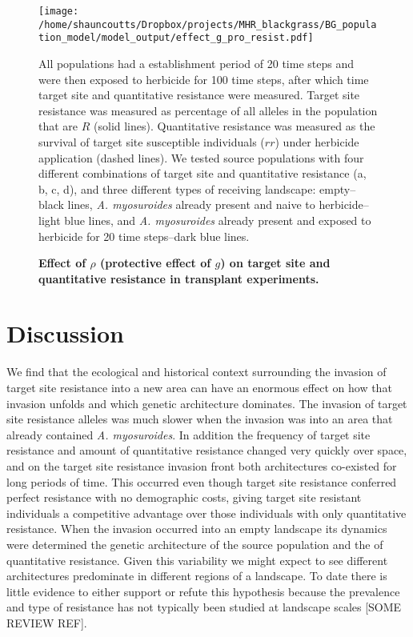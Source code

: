 \documentclass[10pt,letterpaper]{article}
\begin{document}
\begin{figure}[!h] 
	\texttt{[image: /home/shauncoutts/Dropbox/projects/MHR\_blackgrass/BG\_population\_model/model\_output/effect\_g\_pro\_resist.pdf]}
\caption{\bf Effect of $\rho$ (protective effect of $g$) on target site and quantitative resistance in transplant experiments.} All populations had a establishment period of 20 time steps and were then exposed to herbicide for 100 time steps, after which time target site and quantitative resistance were measured. Target site resistance was measured as percentage of all alleles in the population that are $R$ (solid lines). Quantitative resistance was measured as the survival of target site susceptible individuals ($rr$) under herbicide application (dashed lines). We tested source populations with four different combinations of target site and quantitative resistance (a, b, c, d), and three different types of receiving landscape: empty--black lines, \textit{A. myosuroides} already present and naive to herbicide--light blue lines, and \textit{A. myosuroides} already present and exposed to herbicide for 20 time steps--dark blue lines.        
\label{fig:transloc_gpro}
\end{figure}

\section*{Discussion}
We find that the ecological and historical context surrounding the invasion of target site resistance into a new area can have an enormous effect on how that invasion unfolds and which genetic architecture dominates. The invasion of target site resistance alleles was much slower when the invasion was into an area that already contained \textit{A. myosuroides}. In addition the frequency of target site resistance and amount of quantitative resistance changed very quickly over space, and on the target site resistance invasion front both architectures co-existed for long periods of time. This occurred even though target site resistance conferred perfect resistance with no demographic costs, giving target site resistant individuals a competitive advantage over those individuals with only quantitative resistance. When the invasion occurred into an empty landscape its dynamics were determined the genetic architecture of the source population and the of quantitative resistance. Given this variability we might expect to see different architectures predominate in different regions of a landscape. To date there is little evidence to either support or refute this hypothesis because the prevalence and type of resistance has not typically been studied at landscape scales [SOME REVIEW REF].
\end{document}
